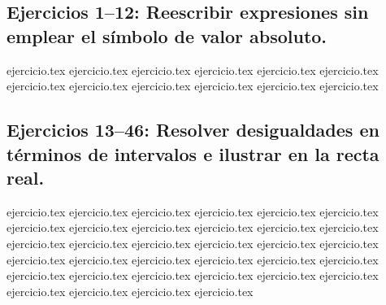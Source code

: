 
\subsection*{Ejercicios 1--12: Reescribir expresiones sin emplear el símbolo de valor absoluto.}
\begin{enumerate}
    {ejercicio.tex}
    {ejercicio.tex}
    {ejercicio.tex}
    {ejercicio.tex}
    {ejercicio.tex}
    {ejercicio.tex}
    {ejercicio.tex}
    {ejercicio.tex}
    {ejercicio.tex}
    {ejercicio.tex}
    {ejercicio.tex}
    {ejercicio.tex}
\end{enumerate}

\subsection*{Ejercicios 13--46: Resolver desigualdades en términos de intervalos e ilustrar en la recta real.}
\begin{enumerate}
    \setcounter{enumi}{12}
    {ejercicio.tex}
    {ejercicio.tex}
    {ejercicio.tex}
    {ejercicio.tex}
    {ejercicio.tex}
    {ejercicio.tex}
    {ejercicio.tex}
    {ejercicio.tex}
    {ejercicio.tex}
    {ejercicio.tex}
    {ejercicio.tex}
    {ejercicio.tex}
    {ejercicio.tex}
    {ejercicio.tex}
    {ejercicio.tex}
    {ejercicio.tex}
    {ejercicio.tex}
    {ejercicio.tex}
    {ejercicio.tex}
    {ejercicio.tex}
    {ejercicio.tex}
    {ejercicio.tex}
    {ejercicio.tex}
    {ejercicio.tex}
    {ejercicio.tex}
    {ejercicio.tex}
    {ejercicio.tex}
    {ejercicio.tex}
    {ejercicio.tex}
    {ejercicio.tex}
    {ejercicio.tex}
    {ejercicio.tex}
    {ejercicio.tex}
    {ejercicio.tex}
\end{enumerate}

